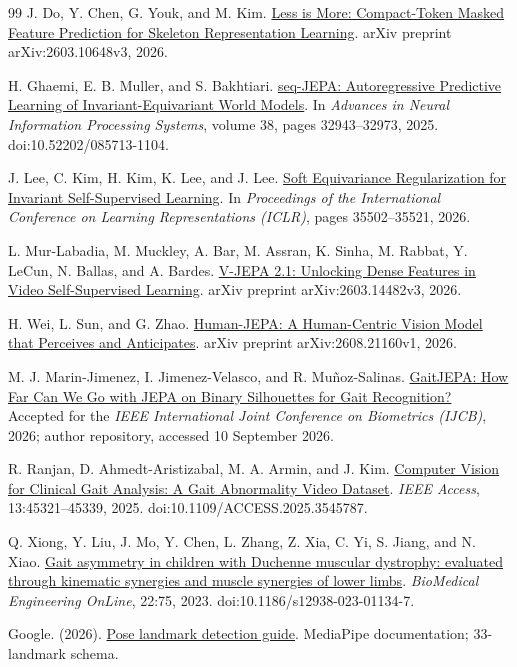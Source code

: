 \documentclass{article}
\begin{document}
{\begin{thebibliography}{99}
 J. Do, Y. Chen, G. Youk, and M. Kim. \href{https://arxiv.org/abs/2603.10648}{Less is More: Compact-Token Masked Feature Prediction for Skeleton Representation Learning}. arXiv preprint arXiv:2603.10648v3, 2026.

 H. Ghaemi, E. B. Muller, and S. Bakhtiari. \href{https://proceedings.neurips.cc/paper_files/paper/2025/hash/2f63d2963526bdd9ff1b8bcc2dc9905a-Abstract-Conference.html}{seq-JEPA: Autoregressive Predictive Learning of Invariant-Equivariant World Models}. In \emph{Advances in Neural Information Processing Systems}, volume 38, pages 32943--32973, 2025. doi:10.52202/085713-1104.

 J. Lee, C. Kim, H. Kim, K. Lee, and J. Lee. \href{https://proceedings.iclr.cc/paper_files/paper/2026/hash/3be6511c8f56d0dca4b5ed59fdf9b2f4-Abstract-Conference.html}{Soft Equivariance Regularization for Invariant Self-Supervised Learning}. In \emph{Proceedings of the International Conference on Learning Representations (ICLR)}, pages 35502--35521, 2026.

 L. Mur-Labadia, M. Muckley, A. Bar, M. Assran, K. Sinha, M. Rabbat, Y. LeCun, N. Ballas, and A. Bardes. \href{https://arxiv.org/abs/2603.14482}{V-JEPA 2.1: Unlocking Dense Features in Video Self-Supervised Learning}. arXiv preprint arXiv:2603.14482v3, 2026.

 H. Wei, L. Sun, and G. Zhao. \href{https://arxiv.org/abs/2608.21160}{Human-JEPA: A Human-Centric Vision Model that Perceives and Anticipates}. arXiv preprint arXiv:2608.21160v1, 2026.

 M. J. Marin-Jimenez, I. Jimenez-Velasco, and R. Muñoz-Salinas. \href{https://github.com/AVAuco/GaitJEPA}{GaitJEPA: How Far Can We Go with JEPA on Binary Silhouettes for Gait Recognition?} Accepted for the \emph{IEEE International Joint Conference on Biometrics (IJCB)}, 2026; author repository, accessed 10 September 2026.

 R. Ranjan, D. Ahmedt-Aristizabal, M. A. Armin, and J. Kim. \href{https://arxiv.org/abs/2407.04190}{Computer Vision for Clinical Gait Analysis: A Gait Abnormality Video Dataset}. \emph{IEEE Access}, 13:45321--45339, 2025. doi:10.1109/ACCESS.2025.3545787.

 Q. Xiong, Y. Liu, J. Mo, Y. Chen, L. Zhang, Z. Xia, C. Yi, S. Jiang, and N. Xiao. \href{https://pmc.ncbi.nlm.nih.gov/articles/PMC10388506/}{Gait asymmetry in children with Duchenne muscular dystrophy: evaluated through kinematic synergies and muscle synergies of lower limbs}. \emph{BioMedical Engineering OnLine}, 22:75, 2023. doi:10.1186/s12938-023-01134-7.

 Google. (2026). \href{https://developers.google.com/edge/mediapipe/solutions/vision/pose_landmarker}{Pose landmark detection guide}. MediaPipe documentation; 33-landmark schema.
\end{thebibliography}
}
\clearpage
\appendix
\label{physworld:appendix-start}
\end{document}
